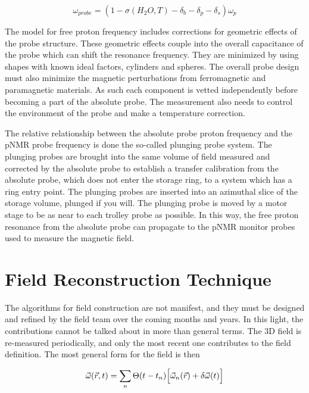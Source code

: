 \begin{equation}
\label{eqn:nmr-effects-model}
\omega_{probe} = (1 - \sigma(H_2 O, T) - \delta_b - \delta_p - \delta_s) \omega_p
\end{equation}

The model for free proton frequency includes corrections for geometric effects of the probe structure.  These geometric effects couple into the overall capacitance of the probe which can shift the resonance frequency.  They are minimized by using shapes with known ideal factors, cylinders and spheres.  The overall probe design must also minimize the magnetic perturbations from ferromagnetic and paramagnetic materials.  As such each component is vetted independently before becoming a part of the absolute probe.  The measurement also needs to control the environment of the probe and make a temperature correction.


The relative relationship between the absolute probe proton frequency and the pNMR probe frequency is done the so-called plunging probe system.  The plunging probes are brought into the same volume of field measured and corrected by the absolute probe to establish a transfer calibration from the absolute probe, which does not enter the storage ring, to a system which has a ring entry point.  The plunging probes are inserted into an azimuthal slice of the storage volume, plunged if you will.  The plunging probe is moved by a motor stage to be as near to each trolley probe as possible.  In this way, the free proton resonance from the absolute probe can propagate to the pNMR monitor probes used to measure the \gmtwo magnetic field.

\section{Field Reconstruction Technique}

The algorithms for field construction are not manifest, and they must be designed and refined by the field team over the coming months and years.  In this light, the contributions cannot be talked about in more than general terms.  The 3D field is re-measured periodically, and only the most recent one contributes to the field definition. The most general form for the field is then

\begin{equation}
\label{eqn:field-construction}
\vec{\omega}(\vec{r}, t) = \sum_n \Theta(t - t_n) \\
\Big[ \vec{\omega}_{n}(\vec{r}) + \delta\vec{\omega}(t) \Big]
\end{equation}

